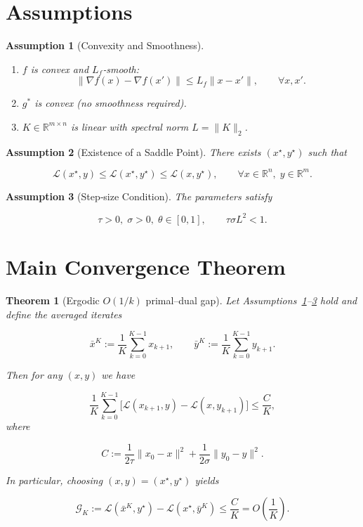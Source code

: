 \documentclass{article}
\newtheorem{theorem}{Theorem}
\newtheorem{assumption}{Assumption}
\begin{document}
\section*{Assumptions}
\begin{assumption}[Convexity and Smoothness]\label{as:convex}
\begin{enumerate}[label=(\roman*)]
\item $f$ is convex and $L_f$‑smooth:
\[
\|\nabla f(x)-\nabla f(x')\|\le L_f\|x-x'\|,\qquad\forall x,x'.
\]
\item $g^{*}$ is convex (no smoothness required).
\item $K\in\mathbb{R}^{m\times n}$ is linear with spectral norm $L=\|K\|_2$.
\end{enumerate}
\end{assumption}

\begin{assumption}[Existence of a Saddle Point]\label{as:saddle}
There exists $(x^{\star},y^{\star})$ such that  

\[
\mathcal L(x^{\star},y)\le\mathcal L(x^{\star},y^{\star})\le\mathcal L(x,y^{\star}),
\qquad\forall x\in\mathbb{R}^{n},\;y\in\mathbb{R}^{m}.
\tag{4}
\]
\end{assumption}

\begin{assumption}[Step‑size Condition]\label{as:steps}
The parameters satisfy  

\[
\tau>0,\;\sigma>0,\;\theta\in[0,1],\qquad
\tau\sigma L^{2}<1.
\tag{5}
\]
\end{assumption}

\section*{Main Convergence Theorem}
\begin{theorem}[Ergodic $O(1/k)$ primal–dual gap]\label{thm:rate}
Let Assumptions~\ref{as:convex}–\ref{as:steps} hold and define the averaged iterates  

\[
\bar x^{K}:=\frac{1}{K}\sum_{k=0}^{K-1}x_{k+1},
\qquad
\bar y^{K}:=\frac{1}{K}\sum_{k=0}^{K-1}y_{k+1}.
\]

Then for any $(x,y)$ we have  

\[
\frac{1}{K}\sum_{k=0}^{K-1}
\bigl[\mathcal L(x_{k+1},y)-\mathcal L(x,y_{k+1})\bigr]
\le
\frac{C}{K},
\tag{6}
\]
where  

\[
C:=\frac{1}{2\tau}\|x_{0}-x\|^{2}+\frac{1}{2\sigma}\|y_{0}-y\|^{2}.
\]

In particular, choosing $(x,y)=(x^{\star},y^{\star})$ yields  

\[
\mathcal G_{K}:=
\mathcal L(\bar x^{K},y^{\star})-\mathcal L(x^{\star},\bar y^{K})
\le\frac{C}{K}=O\!\left(\frac{1}{K}\right).
\tag{7}
\]
\end{theorem}
\end{document}
